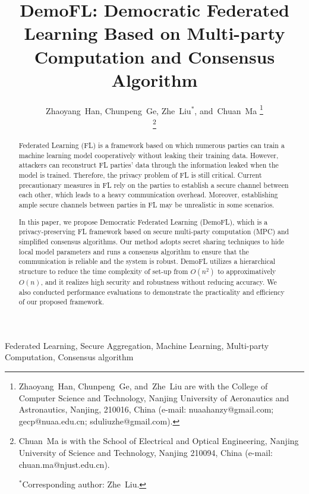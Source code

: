 \documentclass[journal]{IEEEtran}
\begin{document}
\title {DemoFL: Democratic Federated Learning Based on Multi-party Computation and Consensus Algorithm}

\author{Zhaoyang~Han, 
        Chunpeng~Ge, 
        Zhe~Liu$^*$, 
        and~Chuan~Ma%
\thanks{Zhaoyang~Han, Chunpeng~Ge, and~Zhe~Liu are with the College of Computer Science and Technology, Nanjing University of Aeronautics and Astronautics, Nanjing, 210016, China (e-mail: nuaahanzy@gmail.com; gecp@nuaa.edu.cn; sduliuzhe@gmail.com).}

\thanks{Chuan~Ma is with the School of Electrical and Optical Engineering, Nanjing University of Science and Technology, Nanjing 210094, China (e-mail: chuan.ma@njust.edu.cn).

$^*$Corresponding author: Zhe~Liu.}
}

\maketitle

\begin{abstract}
Federated Learning (FL) is a framework based on which numerous parties can train a machine learning model cooperatively without leaking their training data. However, attackers can reconstruct FL parties' data through the information leaked when the model is trained. Therefore, the privacy problem of FL is still critical. Current precautionary measures in FL rely on the parties to establish a secure channel between each other, which leads to a heavy communication overhead. Moreover, establishing ample secure channels between parties in FL may be unrealistic in some scenarios.

In this paper, we propose Democratic Federated Learning (DemoFL), which is a privacy-preserving FL framework based on secure multi-party computation (MPC) and simplified consensus algorithms. Our method adopts secret sharing techniques to hide local model parameters and runs a consensus algorithm to ensure that the communication is reliable and the system is robust. DemoFL utilizes a hierarchical structure to reduce the time complexity of set-up from $O(n^2)$ to approximatively $O(n)$, and it realizes high security and robustness without reducing accuracy. We also conducted performance evaluations to demonstrate the practicality and efficiency of our proposed framework. 

\end{abstract}

\begin{IEEEkeywords}
    Federated Learning, Secure Aggregation, Machine Learning, Multi-party Computation, Consensus algorithm
\end{IEEEkeywords}
\end{document}
